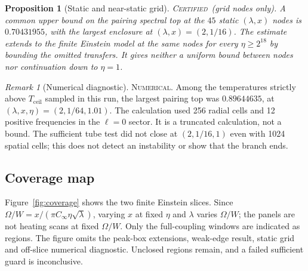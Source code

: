 \documentclass[11pt]{article}
\newcommand{\CERT}{\upshape\mdseries\textsc{Certified}}
\newcommand{\NUM}{\upshape\mdseries\textsc{Numerical}}
\newcommand{\Cinf}{C_\infty}
\newcommand{\Tceil}{T_{\mathrm{ceil}}}
\newtheorem{proposition}[theorem]{Proposition}
\theoremstyle{definition}
\theoremstyle{remark}
\newtheorem{remark}[theorem]{Remark}
\begin{document}
\begin{proposition}[Static and near-static grid]\label{prop:V4static}
\noindent\CERT\ (grid nodes only). A common upper bound on the pairing spectral top at the $45$ static $(\lambda,x)$ nodes is $0.70431955$, with the largest enclosure at $(\lambda,x)=(2,1/16)$. The estimate extends to the finite Einstein model at the same nodes for every $\eta\ge2^{18}$ by bounding the omitted transfers. It gives neither a uniform bound between nodes nor continuation down to $\eta=1$.
\end{proposition}

\begin{remark}[Numerical diagnostic]\label{rem:V4num}
\NUM. Among the temperatures strictly above $\Tceil$ sampled in this run, the largest pairing top was $0.89644635$, at $(\lambda,x,\eta)=(2,1/64,1.01)$. The calculation used 256 radial cells and 12 positive frequencies in the $\ell=0$ sector. It is a truncated calculation, not a bound. The sufficient tube test did not close at $(2,1/16,1)$ even with 1024 spatial cells; this does not detect an instability or show that the branch ends.
\end{remark}

\subsection{Coverage map}

Figure~\ref{fig:coverage} shows the two finite Einstein slices. Since $\Omega/W=x/(\pi\Cinf\eta\sqrt{\lambda})$, varying $x$ at fixed $\eta$ and $\lambda$ varies $\Omega/W$; the panels are not heating scans at fixed $\Omega/W$. Only the full-coupling windows are indicated as regions. The figure omits the peak-box extensions, weak-edge result, static grid and off-slice numerical diagnostic. Unclosed regions remain, and a failed sufficient guard is inconclusive.
\end{document}

